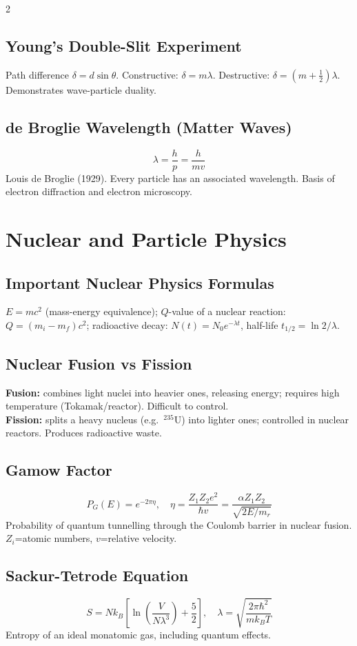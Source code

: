 \documentclass[10pt,a4paper]{article}
\begin{document}
\begin{multicols}{2}
\subsection{Young's Double-Slit Experiment}
Path difference $\delta = d\sin\theta$. Constructive: $\delta = m\lambda$. Destructive: $\delta = (m+\frac{1}{2})\lambda$. Demonstrates wave-particle duality.

\subsection{de Broglie Wavelength (Matter Waves)}
\[
\lambda = \frac{h}{p} = \frac{h}{mv}
\]
Louis de Broglie (1929). Every particle has an associated wavelength. Basis of electron diffraction and electron microscopy.

\section{Nuclear and Particle Physics}

\subsection{Important Nuclear Physics Formulas}
$E = mc^2$ (mass-energy equivalence); $Q$-value of a nuclear reaction: $Q = (m_i - m_f)c^2$; radioactive decay: $N(t) = N_0 e^{-\lambda t}$, half-life $t_{1/2} = \ln 2/\lambda$.

\subsection{Nuclear Fusion vs Fission}
\textbf{Fusion:} combines light nuclei into heavier ones, releasing energy; requires high temperature (Tokamak/reactor). Difficult to control.\\
\textbf{Fission:} splits a heavy nucleus (e.g.\ $^{235}$U) into lighter ones; controlled in nuclear reactors. Produces radioactive waste.

\subsection{Gamow Factor}
\[
P_G(E) = e^{-2\pi\eta}, \quad \eta = \frac{Z_1 Z_2 e^2}{\hbar v} = \frac{\alpha Z_1 Z_2}{\sqrt{2E/m_r}}
\]
Probability of quantum tunnelling through the Coulomb barrier in nuclear fusion. $Z_i$=atomic numbers, $v$=relative velocity.

\subsection{Sackur-Tetrode Equation}
\[
S = Nk_B\left[\ln\!\left(\frac{V}{N\lambda^3}\right) + \frac{5}{2}\right], \quad \lambda = \sqrt{\frac{2\pi\hbar^2}{mk_BT}}
\]
Entropy of an ideal monatomic gas, including quantum effects.


\end{multicols}
\end{document}

